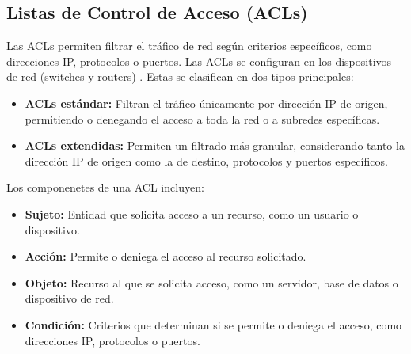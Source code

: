 \subsection{Listas de Control de Acceso (ACLs)}
\label{subsec:acl}
Las \acs{ACL}s permiten filtrar el tráfico de red según criterios específicos, como direcciones \acs{IP}, protocolos o puertos. Las ACLs se configuran en los dispositivos de red (switches y routers) \cite{cisco-hospital-design}. Estas se 
clasifican en dos tipos principales:

\begin{itemize}
    \item \textbf{\acs{ACL}s estándar:} Filtran el tráfico únicamente por dirección \acs{IP} de origen, permitiendo o denegando el acceso a toda la red o a subredes específicas.
    \item \textbf{\acs{ACL}s extendidas:} Permiten un filtrado más granular, considerando tanto la dirección \acs{IP} de origen como la de destino, protocolos y puertos específicos.
\end{itemize}

Los componenetes de una \acs{ACL} incluyen:
\begin{itemize}
    \item \textbf{Sujeto:} Entidad que solicita acceso a un recurso, como un usuario o dispositivo.
    \item \textbf{Acción:} Permite o deniega el acceso al recurso solicitado.
    \item \textbf{Objeto:} Recurso al que se solicita acceso, como un servidor, base de datos o dispositivo de red.
    \item \textbf{Condición:} Criterios que determinan si se permite o deniega el acceso, como direcciones \acs{IP}, protocolos o puertos.
\end{itemize}

